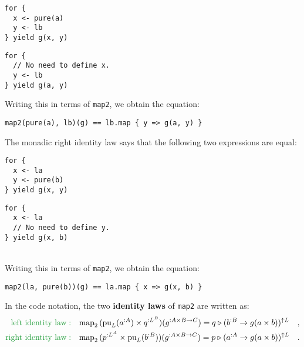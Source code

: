 \vspace{0.2\baselineskip}

\noindent %
\begin{minipage}[c][1\totalheight][t]{0.4\columnwidth}%
\begin{lstlisting}
for {
  x <- pure(a)
  y <- lb
} yield g(x, y)
\end{lstlisting}
%
\end{minipage}\hfill{}%
\begin{minipage}[c][1\totalheight][t]{0.4\columnwidth}%
\begin{lstlisting}
for {
  // No need to define x. 
  y <- lb
} yield g(a, y)
\end{lstlisting}
%
\end{minipage}

Writing this in terms of \lstinline!map2!, we obtain the equation:
\begin{lstlisting}
map2(pure(a), lb)(g) == lb.map { y => g(a, y) }
\end{lstlisting}

The monadic right identity law says that the following two expressions
are equal:

\vspace{0.2\baselineskip}

\noindent %
\begin{minipage}[c][1\totalheight][t]{0.4\columnwidth}%
\begin{lstlisting}
for {
  x <- la
  y <- pure(b)
} yield g(x, y)
\end{lstlisting}
%
\end{minipage}\hfill{}%
\begin{minipage}[c][1\totalheight][t]{0.4\columnwidth}%
\begin{lstlisting}
for {
  x <- la
  // No need to define y. 
} yield g(x, b)
\end{lstlisting}
%
\end{minipage}\\
Writing this in terms of \lstinline!map2!, we obtain the equation:
\begin{lstlisting}
map2(la, pure(b))(g) == la.map { x => g(x, b) }
\end{lstlisting}

In the code notation, the two \textbf{identity
laws} of \lstinline!map2! are written as:
\begin{align*}
{\color{greenunder}\text{left identity law}:}\quad & \text{map}_{2}\,(\text{pu}_{L}(a^{:A})\times q^{:L^{B}})(g^{:A\times B\rightarrow C})=q\triangleright(b^{:B}\rightarrow g(a\times b))^{\uparrow L}\quad,\\
{\color{greenunder}\text{right identity law}:}\quad & \text{map}_{2}\,(p^{:L^{A}}\times\text{pu}_{L}(b^{:B}))(g^{:A\times B\rightarrow C})=p\triangleright(a^{:A}\rightarrow g(a\times b))^{\uparrow L}\quad.
\end{align*}

